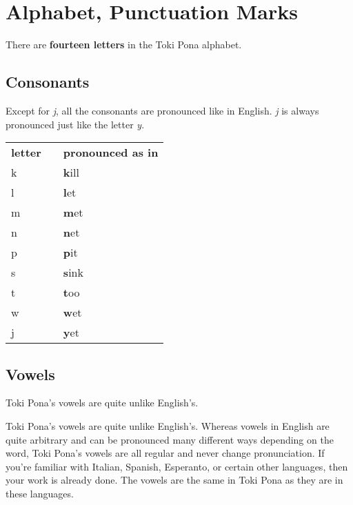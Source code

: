 
\section{Alphabet, Punctuation Marks}
\label{'pronunciation_alphabet'}
There are \textbf{fourteen letters} in the Toki Pona alphabet.

\subsection*{Consonants}
Except for \textit{j}, all the consonants are pronounced like in English.
\textit{j} is always pronounced just like the letter \textit{y}.

\begin{supertabular}{p{2cm}|ll}
    \textbf{letter} &  & \textbf{pronounced as in} \\
    k               &  & \textbf{k}ill             \\
    l               &  & \textbf{l}et              \\
    m               &  & \textbf{m}et              \\
    n               &  & \textbf{n}et              \\
    p               &  & \textbf{p}it              \\
    s               &  & \textbf{s}ink             \\
    t               &  & \textbf{t}oo              \\
    w               &  & \textbf{w}et              \\
    j               &  & \textbf{y}et              \\
\end{supertabular}

\subsection*{Vowels}
Toki Pona's vowels are quite unlike English's.

Toki Pona's vowels are quite unlike English's. Whereas vowels in English are quite arbitrary and can be pronounced many different ways depending on the word, Toki Pona's vowels are all regular and never change pronunciation.
If you're familiar with Italian, Spanish, Esperanto, or certain other languages, then your work is already done. The vowels are the same in Toki Pona as they are in these languages.

